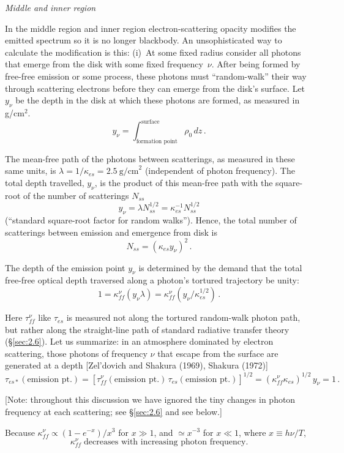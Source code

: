 \medskip
\noindent
\textit{Middle and inner region}

In the middle region and inner region electron-scattering opacity modifies the
emitted spectrum so it is no longer blackbody.  An unsophisticated way to calculate
the modification is this: (i)~At some fixed radius consider all photons that
emerge from the disk with some fixed frequency~$\nu$.  After being formed by free-free
emission or some process, these photons must ``random-walk'' their
way through scattering electrons before they can emerge from the disk's
surface.  Let $y_\nu$ be the depth in the disk at which these photons are formed, as
measured in g/cm$^2$.
%
\[
y_\nu = \int_{\text{formation point}}^{\text{surface}} \rho_0 \, dz\,.
\]

The mean-free path of the photons between scatterings, as measured in these
same units, is $\lambda = 1/\kappa_{es} = 2.5~\text{g/cm}^2$ (independent of photon frequency).  The
total depth travelled, $y_\nu$, is the product of this mean-free path with the square-root
of the number of scatterings $N_{ss}$
%
\[
y_\nu = \lambda N_{ss}^{1/2} = \kappa_{es}^{-1} N_{ss}^{1/2}
\]
%
(``standard square-root factor for random walks'').  Hence, the total number of
scatterings between emission and emergence from disk is
%
\[
N_{ss} = (\kappa_{es} y_\nu)^2\,.
\]

The depth of the emission point $y_\nu$ is determined by the demand that the total
free-free optical depth traversed along a photon's tortured trajectory be unity:
%
\[
1 = \kappa_{ff}^{\nu}(y_\nu \lambda) = \kappa_{ff}^{\nu}(y_\nu / \kappa_{es}^{1/2})\,.
\]

Here $\tau_{ff}^{\nu}$ like $\tau_{es}$ is measured not along the tortured random-walk photon path,
but rather along the straight-line path of standard radiative transfer theory (\S\ref{sec:2.6}).
Let us summarize: in an atmosphere dominated by electron scattering, those
photons of frequency $\nu$ that escape from the surface are generated at a depth
[Zel'dovich and Shakura (1969), Shakura (1972)]
%
\begin{equation}
\tag{5.10.2}
\tau_{es*}(\text{emission pt.})
= [\tau_{ff}^{\nu}(\text{emission pt.})\,\tau_{es}(\text{emission pt.})]^{1/2}
= (\kappa_{ff}^{\nu}\kappa_{es})^{1/2}\,y_\nu = 1\,.
\end{equation}

[Note: throughout this discussion we have ignored the tiny changes in photon
frequency at each scattering; see \S\ref{sec:2.6} and see below.]

Because $\kappa_{ff}^{\nu} \propto (1 - e^{-x})/x^3$ for $x \gg 1$, and $\simeq x^{-3}$ for $x \ll 1$,
where $x \equiv h\nu/T$,
%
\begin{equation}
\tag{5.10.3}
\kappa_{ff}^{\nu} \; \text{decreases with increasing photon frequency.}
\end{equation}

